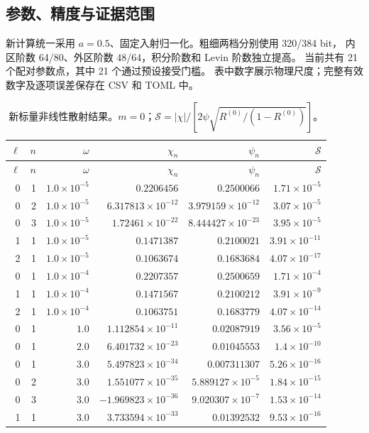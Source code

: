 \subsection{参数、精度与证据范围}
新计算统一采用 $a=0.5$、固定入射归一化。粗细两档分别使用 320/384 bit，
内区阶数 64/80、外区阶数 48/64，积分阶数和 Levin 阶数独立提高。
当前共有 21 个配对参数点，其中 21 个通过预设接受门槛。
表中数字展示物理尺度；完整有效数字及逐项误差保存在 CSV 和 TOML 中。
\begin{longtable}{rrrrrr}
\caption{新标量非线性散射结果。$m=0$；$\mathcal S=|\chi|/[2\psi\sqrt{R^{(0)}/(1-R^{(0)})}]$。}\\
\toprule $\ell$ & $n$ & $\omega$ & $\chi_n$ & $\psi_n$ & $\mathcal S$\\\midrule\endfirsthead
\toprule $\ell$ & $n$ & $\omega$ & $\chi_n$ & $\psi_n$ & $\mathcal S$\\\midrule\endhead
0 & 1 & $1.0\times10^{-5}$ & $0.2206456$ & $0.2500066$ & $1.71\times10^{-5}$\\
0 & 2 & $1.0\times10^{-5}$ & $6.317813\times10^{-12}$ & $3.979159\times10^{-12}$ & $3.07\times10^{-5}$\\
0 & 3 & $1.0\times10^{-5}$ & $1.72461\times10^{-22}$ & $8.444427\times10^{-23}$ & $3.95\times10^{-5}$\\
1 & 1 & $1.0\times10^{-5}$ & $0.1471387$ & $0.2100021$ & $3.91\times10^{-11}$\\
2 & 1 & $1.0\times10^{-5}$ & $0.1063674$ & $0.1683684$ & $4.07\times10^{-17}$\\
0 & 1 & $1.0\times10^{-4}$ & $0.2207357$ & $0.2500659$ & $1.71\times10^{-4}$\\
1 & 1 & $1.0\times10^{-4}$ & $0.1471567$ & $0.2100212$ & $3.91\times10^{-9}$\\
2 & 1 & $1.0\times10^{-4}$ & $0.1063751$ & $0.1683779$ & $4.07\times10^{-14}$\\
0 & 1 & $1.0$ & $1.112854\times10^{-11}$ & $0.02087919$ & $3.56\times10^{-5}$\\
0 & 1 & $2.0$ & $6.401732\times10^{-23}$ & $0.01045553$ & $1.4\times10^{-10}$\\
0 & 1 & $3.0$ & $5.497823\times10^{-34}$ & $0.007311307$ & $5.26\times10^{-16}$\\
0 & 2 & $3.0$ & $1.551077\times10^{-35}$ & $5.889127\times10^{-5}$ & $1.84\times10^{-15}$\\
0 & 3 & $3.0$ & $-1.969823\times10^{-36}$ & $9.020307\times10^{-7}$ & $1.53\times10^{-14}$\\
1 & 1 & $3.0$ & $3.733594\times10^{-33}$ & $0.01392532$ & $9.53\times10^{-16}$\\

\end{longtable}
